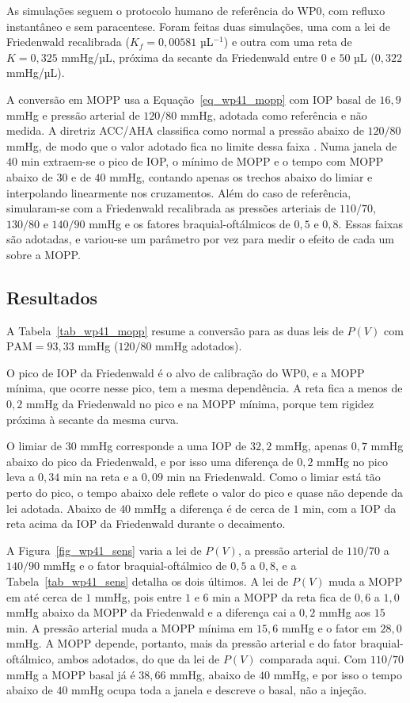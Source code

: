 As simulações seguem o protocolo humano de referência do WP0, com refluxo instantâneo e sem paracentese. Foram feitas duas simulações, uma com a lei de Friedenwald recalibrada ($K_f=0{,}00581$ µL$^{-1}$) e outra com uma reta de $K=0{,}325$ mmHg/µL, próxima da secante da Friedenwald entre $0$ e $50$ µL ($0{,}322$ mmHg/µL).

A conversão em MOPP usa a Equação~\ref{eq_wp41_mopp} com IOP basal de $16{,}9$ mmHg e pressão arterial de $120/80$ mmHg, adotada como referência e não medida. A diretriz ACC/AHA classifica como normal a pressão abaixo de $120/80$ mmHg, de modo que o valor adotado fica no limite dessa faixa \citep{whelton2018}. Numa janela de $40$ min extraem-se o pico de IOP, o mínimo de MOPP e o tempo com MOPP abaixo de $30$ e de $40$ mmHg, contando apenas os trechos abaixo do limiar e interpolando linearmente nos cruzamentos. Além do caso de referência, simularam-se com a Friedenwald recalibrada as pressões arteriais de $110/70$, $130/80$ e $140/90$ mmHg e os fatores braquial-oftálmicos de $0{,}5$ e $0{,}8$. Essas faixas são adotadas, e variou-se um parâmetro por vez para medir o efeito de cada um sobre a MOPP.

\subsection{Resultados}

A Tabela~\ref{tab_wp41_mopp} resume a conversão para as duas leis de $P(V)$ com $\mathrm{PAM}=93{,}33$ mmHg ($120/80$ mmHg adotados).

O pico de IOP da Friedenwald é o alvo de calibração do WP0, e a MOPP mínima, que ocorre nesse pico, tem a mesma dependência. A reta fica a menos de $0{,}2$ mmHg da Friedenwald no pico e na MOPP mínima, porque tem rigidez próxima à secante da mesma curva.

O limiar de $30$ mmHg corresponde a uma IOP de $32{,}2$ mmHg, apenas $0{,}7$ mmHg abaixo do pico da Friedenwald, e por isso uma diferença de $0{,}2$ mmHg no pico leva a $0{,}34$ min na reta e a $0{,}09$ min na Friedenwald. Como o limiar está tão perto do pico, o tempo abaixo dele reflete o valor do pico e quase não depende da lei adotada. Abaixo de $40$ mmHg a diferença é de cerca de $1$ min, com a IOP da reta acima da IOP da Friedenwald durante o decaimento.

A Figura~\ref{fig_wp41_sens} varia a lei de $P(V)$, a pressão arterial de $110/70$ a $140/90$ mmHg e o fator braquial-oftálmico de $0{,}5$ a $0{,}8$, e a Tabela~\ref{tab_wp41_sens} detalha os dois últimos. A lei de $P(V)$ muda a MOPP em até cerca de $1$ mmHg, pois entre $1$ e $6$ min a MOPP da reta fica de $0{,}6$ a $1{,}0$ mmHg abaixo da MOPP da Friedenwald e a diferença cai a $0{,}2$ mmHg aos $15$ min. A pressão arterial muda a MOPP mínima em $15{,}6$ mmHg e o fator em $28{,}0$ mmHg. A MOPP depende, portanto, mais da pressão arterial e do fator braquial-oftálmico, ambos adotados, do que da lei de $P(V)$ comparada aqui. Com $110/70$ mmHg a MOPP basal já é $38{,}66$ mmHg, abaixo de $40$ mmHg, e por isso o tempo abaixo de $40$ mmHg ocupa toda a janela e descreve o basal, não a injeção.

